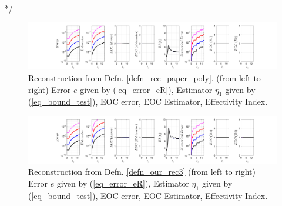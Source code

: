 \documentclass[12pt,a4paper]{article}
\numberwithin{equation}{section}
\theoremstyle{definition}
\begin{document}
*/
\begin{figure}[H]
	\hspace{-3cm}
	\includegraphics[scale=0.55]{fig_LeapFrogplots_1x5_sin_IC_harmonic_u7_v3_paperrec_poly_our_res}	
	\caption{Reconstruction from Defn. \ref{defn_rec_paper_poly}. (from left to right) Error $e$ given by (\ref{eq_error_eR}), Estimator $\eta_1$ given by (\ref{eq_bound_test}), EOC error, EOC Estimator, Effectivity Index.}
	\label{fig_all_in_one_paperrec_poly_u07_v03}
\end{figure}

\begin{figure}[H]
	\hspace{-3cm}
	\includegraphics[scale=0.55]{fig_LeapFrogplots_1x5_sin_IC_harmonic_u7_v3_paperrec_poly_tristan}	
\caption{Reconstruction from Defn. \ref{defn_our_rec3} (from left to right) Error $e$ given by (\ref{eq_error_eR}), Estimator $\eta_1$ given by (\ref{eq_bound_test}), EOC error, EOC Estimator, Effectivity Index.}
	\label{fig_all_in_one_paperrec_poly_tristan_u7_v3}
\end{figure}
\end{document}
